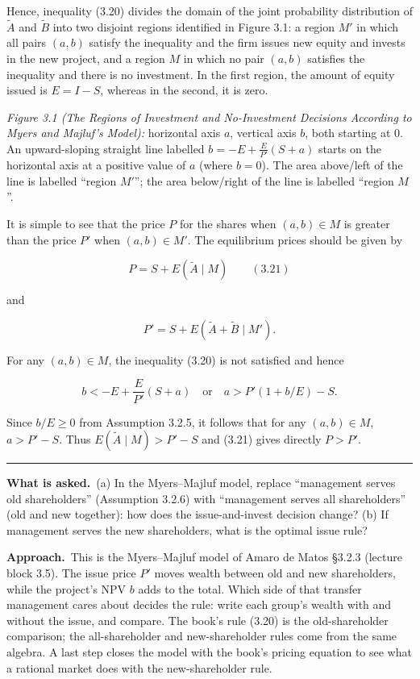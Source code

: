\documentclass[11pt,a4paper]{article}
\newcommand{\asked}{\par\medskip\noindent\textbf{What is asked.}~}
\newcommand{\approach}{\par\smallskip\noindent\textbf{Approach.}~}
\newcommand{\stmtend}{\par\endgroup\nopagebreak\noindent\rule{\linewidth}{0.4pt}\par\medskip}
\begin{document}
Hence, inequality (3.20) divides the domain of the joint probability distribution of
\(\widetilde{A}\) and \(\widetilde{B}\) into two disjoint regions identified in Figure 3.1: a region
\(M'\) in which all pairs \((a, b)\) satisfy the inequality and the firm issues new equity and
invests in the new project, and a region \(M\) in which no pair \((a, b)\) satisfies the inequality
and there is no investment. In the first region, the amount of equity issued is \(E = I - S\),
whereas in the second, it is zero.

\emph{Figure 3.1 (The Regions of Investment and No-Investment Decisions According to Myers and
Majluf's Model):} horizontal axis \(a\), vertical axis \(b\), both starting at 0. An upward-sloping
straight line labelled \(b = -E + \frac{E}{P'}(S + a)\) starts on the horizontal axis at a positive
value of \(a\) (where \(b = 0\)). The area above/left of the line is labelled ``region \(M'\)''; the
area below/right of the line is labelled ``region \(M\)''.

It is simple to see that the price \(P\) for the shares when \((a, b) \in M\) is greater than the
price \(P'\) when \((a, b) \in M'\). The equilibrium prices should be given by

\[P = S + E(\widetilde{A} \mid M) \qquad (3.21)\]

and

\[P' = S + E(\widetilde{A} + \widetilde{B} \mid M').\]

For any \((a, b) \in M\), the inequality (3.20) is not satisfied and hence

\[b < -E + \frac{E}{P'}(S + a) \quad \text{or} \quad a > P'(1 + b/E) - S.\]

Since \(b/E \geq 0\) from Assumption 3.2.5, it follows that for any \((a, b) \in M\),
\(a > P' - S\). Thus \(E(\widetilde{A} \mid M) > P' - S\) and (3.21) gives directly \(P > P'\).
\stmtend

\asked (a) In the Myers--Majluf model, replace ``management serves old shareholders'' (Assumption 3.2.6) with ``management serves all shareholders'' (old and new together): how does the issue-and-invest decision change? (b) If management serves the new shareholders, what is the optimal issue rule?

\approach This is the Myers--Majluf model of Amaro de Matos \S3.2.3 (lecture block 3.5). The issue price $P'$ moves wealth between old and new shareholders, while the project's NPV $b$ adds to the total. Which side of that transfer management cares about decides the rule: write each group's wealth with and without the issue, and compare. The book's rule (3.20) is the old-shareholder comparison; the all-shareholder and new-shareholder rules come from the same algebra. A last step closes the model with the book's pricing equation to see what a rational market does with the new-shareholder rule.
\end{document}
